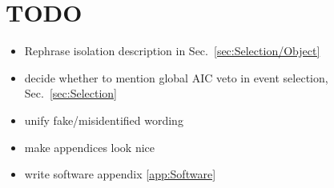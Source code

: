 \documentclass[11pt]{ruthesis}
\begin{document}





\tablespage %
\figurespage %

\afterpreface

\section*{TODO}
\begin{itemize}
	\item Rephrase isolation description in Sec.~\ref{sec:Selection/Object}
	\item decide whether to mention global AIC veto in event selection, Sec.~\ref{sec:Selection}
	\item unify fake/misidentified wording
	\item make appendices look nice
	\item write software appendix \ref{app:Software}
\end{itemize}












\clearpage

\appendix


\clearpage

\begin{singlespace}


\end{singlespace}

\end{document}
